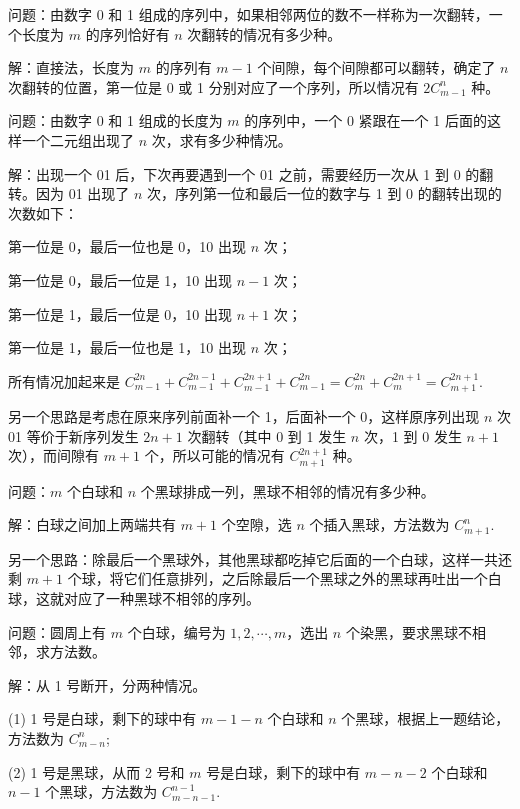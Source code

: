 \vbox{}

问题：由数字 0 和 1 组成的序列中，如果相邻两位的数不一样称为一次翻转，一个长度为 $ m $ 的序列恰好有 $ n $ 次翻转的情况有多少种。

解：直接法，长度为 $ m $ 的序列有 $ m - 1 $ 个间隙，每个间隙都可以翻转，确定了 $ n $ 次翻转的位置，第一位是 0 或 1 分别对应了一个序列，所以情况有 $ 2 C_{m-1}^n $ 种。

\vbox{}

问题：由数字 0 和 1 组成的长度为 $ m $ 的序列中，一个 0 紧跟在一个 1 后面的这样一个二元组出现了 $ n $ 次，求有多少种情况。

解：出现一个 01 后，下次再要遇到一个 01 之前，需要经历一次从 1 到 0 的翻转。因为 01 出现了 $ n $ 次，序列第一位和最后一位的数字与 1 到 0 的翻转出现的次数如下：

第一位是 0，最后一位也是 0，10 出现 $ n $ 次；

第一位是 0，最后一位是 1，10 出现 $ n - 1 $ 次；

第一位是 1，最后一位是 0，10 出现 $ n + 1 $ 次；

第一位是 1，最后一位也是 1，10 出现 $ n $ 次；

\noindent 所有情况加起来是 $ C_{m-1}^{2n} + C_{m-1}^{2n-1} + C_{m-1}^{2n+1} + C_{m-1}^{2n} = C_m^{2n} + C_m^{2n+1} = C_{m+1}^{2n+1} $.

另一个思路是考虑在原来序列前面补一个 1，后面补一个 0，这样原序列出现 $ n $ 次 01 等价于新序列发生 $ 2n+1 $ 次翻转（其中 0 到 1 发生 $ n $ 次，1 到 0 发生 $ n + 1 $ 次），而间隙有 $ m + 1 $ 个，所以可能的情况有 $ C_{m+1}^{2n+1} $ 种。

\vbox{}

问题：$ m $ 个白球和 $ n $ 个黑球排成一列，黑球不相邻的情况有多少种。

解：白球之间加上两端共有 $ m + 1$ 个空隙，选 $ n $ 个插入黑球，方法数为 $ C_{m+1}^n $.

另一个思路：除最后一个黑球外，其他黑球都吃掉它后面的一个白球，这样一共还剩 $ m + 1 $ 个球，将它们任意排列，之后除最后一个黑球之外的黑球再吐出一个白球，这就对应了一种黑球不相邻的序列。

\vbox{}

问题：圆周上有 $ m $ 个白球，编号为 $ 1,2,\cdots,m $，选出 $ n $ 个染黑，要求黑球不相邻，求方法数。

解：从 1 号断开，分两种情况。

(1) 1 号是白球，剩下的球中有 $ m - 1 - n $ 个白球和 $ n $ 个黑球，根据上一题结论，方法数为 $ C_{m-n}^n $;

(2) 1 号是黑球，从而 2 号和 $ m $ 号是白球，剩下的球中有 $ m - n - 2 $ 个白球和 $ n - 1 $ 个黑球，方法数为 $ C_{m-n-1}^{n-1} $.

